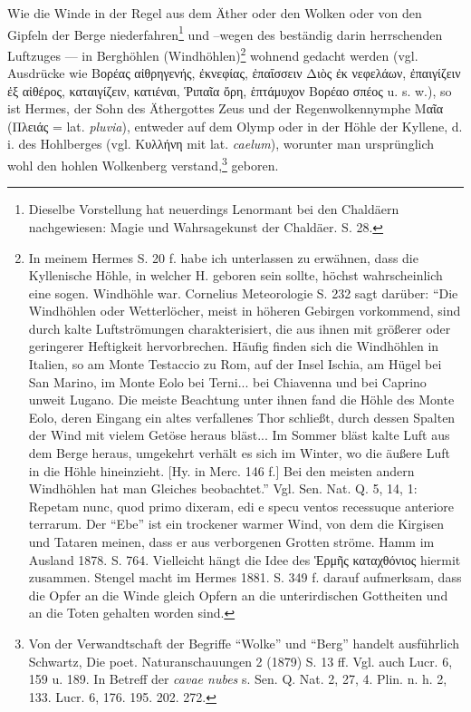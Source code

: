 \documentclass[a4paper, 11pt, oneside]{article}
\begin{document}
Wie die Winde in der Regel aus dem Äther oder den Wolken oder von den Gipfeln der Berge niederfahren\footnote{Dieselbe Vorstellung hat neuerdings Lenormant bei den Chaldäern nachgewiesen: Magie und Wahrsagekunst der Chaldäer. S. 28.} und --wegen des beständig darin herrschenden Luftzuges --- in Berghöhlen (Windhöhlen)\footnote{In meinem Hermes S. 20 f. habe ich unterlassen zu erwähnen, dass die Kyllenische Höhle, in welcher H. geboren sein sollte, höchst wahrscheinlich eine sogen. Windhöhle war. Cornelius Meteorologie S. 232 sagt darüber: "`Die Windhöhlen oder Wetterlöcher, meist in höheren Gebirgen vorkommend, sind durch kalte Luftströmungen charakterisiert, die aus ihnen mit größerer oder geringerer Heftigkeit hervorbrechen. Häufig finden sich die Windhöhlen in Italien, so am Monte Testaccio zu Rom, auf der Insel Ischia, am Hügel bei San Marino, im Monte Eolo bei Terni... bei Chiavenna und bei Caprino unweit Lugano. Die meiste Beachtung unter ihnen fand die Höhle des Monte Eolo, deren Eingang ein altes verfallenes Thor schließt, durch dessen Spalten der Wind mit vielem Getöse heraus bläst... Im Sommer bläst kalte Luft aus dem Berge heraus, umgekehrt verhält es sich im Winter, wo die äußere Luft in die Höhle hineinzieht. [Hy. in Merc. 146 f.] Bei den meisten andern Windhöhlen hat man Gleiches beobachtet."' Vgl. Sen. Nat. Q. 5, 14, 1: Repetam nunc, quod primo dixeram, edi e specu ventos recessuque anteriore terrarum. Der "`Ebe"' ist ein trockener warmer Wind, von dem die Kirgisen und Tataren meinen, dass er aus verborgenen Grotten ströme. Hamm im Ausland 1878. S. 764. Vielleicht hängt die Idee des Ἑρμῆς καταχθόνιος hiermit zusammen. Stengel macht im Hermes 1881. S. 349 f. darauf aufmerksam, dass die Opfer an die Winde gleich Opfern an die unterirdischen Gottheiten und an die Toten gehalten worden sind.} wohnend gedacht werden (vgl. Ausdrücke wie Βορέας αἰθρηγενής, ἐκνεφίας, ἐπαΐσσειν Διὸς ἐκ νεφελάων, ἐπαιγίζειν ἐξ αἰθέρος, καταιγίζειν, κατιέναι, Ῥιπαῖα ὄρη, ἑπτάμυχον Βορέαο σπέος u. s. w.), so ist Hermes, der Sohn des Äthergottes Zeus und der Regenwolkennymphe Μαῖα (Πλειάς = lat. \emph{pluvia}), entweder auf dem Olymp oder in der Höhle der Kyllene, d. i. des Hohlberges (vgl. Κυλλήνη mit lat. \emph{caelum}), worunter man ursprünglich wohl den hohlen Wolkenberg verstand,\footnote{Von der Verwandtschaft der Begriffe "`Wolke"' und "`Berg"' handelt ausführlich Schwartz, Die poet. Naturanschauungen 2 (1879) S. 13 ff. Vgl. auch Lucr. 6, 159 u. 189. In Betreff der \emph{cavae nubes} s. Sen. Q. Nat. 2, 27, 4. Plin. n. h. 2, 133. Lucr. 6, 176. 195. 202. 272.} geboren.
\end{document}
